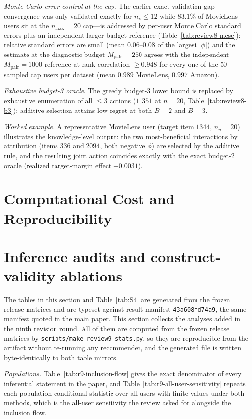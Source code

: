 \documentclass[manuscript,screen,anonymous]{acmart}
\newcommand{\resultmanifeststamp}{43a608fd74a9}
\begin{document}
\emph{Monte Carlo error control at the cap.} The earlier exact-validation gap---
convergence was only validated exactly for $n_u\le12$ while $83.1\%$ of
MovieLens users sit at the $n_{\max}=20$ cap---is addressed by per-user Monte Carlo
standard errors plus an independent larger-budget reference
(Table~\ref{tab:review8-mcse}): relative standard errors are small (mean
$0.06$--$0.08$ of the largest $|\phi|$) and the estimate at the diagnostic budget
$M_{\mathrm{pair}}=250$ agrees with the independent $M_{\mathrm{pair}}=1000$ reference
at rank correlation $\ge0.948$ for every one of the 50 sampled cap users per
dataset (mean $0.989$ MovieLens, $0.997$ Amazon).

\emph{Exhaustive budget-3 oracle.} The greedy budget-3 lower bound is replaced
by exhaustive enumeration of all $\le3$ actions ($1{,}351$ at $n=20$,
Table~\ref{tab:review8-b3}); additive selection attains low regret at both
$B=2$ and $B=3$.

\emph{Worked example.} A representative MovieLens user (target item $1344$,
$n_u=20$) illustrates the knowledge-level output: the two most-beneficial
interactions by attribution (items $336$ and $2094$, both negative $\phi$) are
selected by the additive rule, and the resulting joint action coincides exactly
with the exact budget-2 oracle (realized target-margin effect $+0.0031$).

\FloatBarrier
\section{Computational Cost and Reproducibility}\label{app:release}

\FloatBarrier

\section{Inference audits and construct-validity ablations}\label{app:review9}
The tables in this section and Table~\ref{tab:S4} are generated from the frozen release matrices and are typeset against result manifest \texttt{\resultmanifeststamp}, the same manifest quoted in the main paper.
This section collects the analyses added in the ninth revision round. All of them
are computed from the frozen release matrices by
\texttt{scripts/make\_review9\_stats.py}, so they are reproducible from the
artifact without re-running any recommender, and the generated file is written
byte-identically to both table mirrors.

\emph{Populations.} Table~\ref{tab:r9-inclusion-flow} gives the exact
denominator of every inferential statement in the paper, and
Table~\ref{tab:r9-all-user-sensitivity} repeats each population-conditional
statistic over all users with finite values under both methods, which is the
all-user sensitivity the review asked for alongside the inclusion flow.
\end{document}
